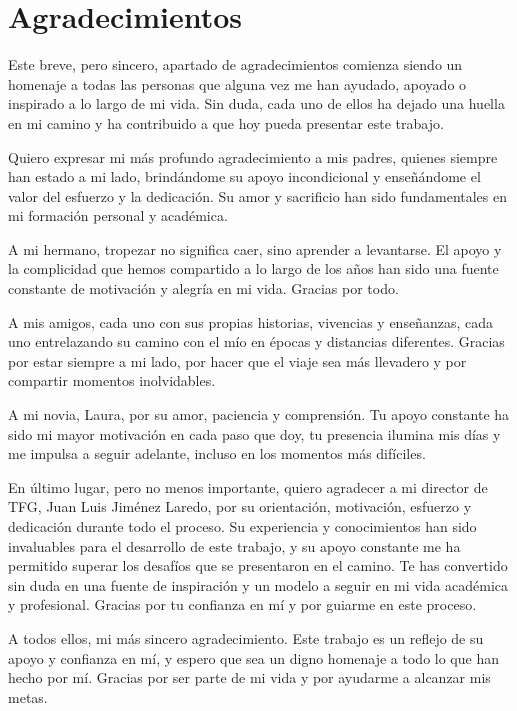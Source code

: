 \chapter*{Agradecimientos}

Este breve, pero sincero, apartado de agradecimientos comienza siendo un homenaje a todas las personas que alguna vez me han ayudado, apoyado o inspirado a lo largo de mi vida. Sin duda, cada uno de ellos ha dejado una huella en mi camino y ha contribuido a que hoy pueda presentar este trabajo.

Quiero expresar mi más profundo agradecimiento a mis padres, quienes siempre han estado a mi lado, brindándome su apoyo incondicional y enseñándome el valor del esfuerzo y la dedicación. Su amor y sacrificio han sido fundamentales en mi formación personal y académica.

A mi hermano, tropezar no significa caer, sino aprender a levantarse. El apoyo y la complicidad que hemos compartido a lo largo de los años han sido una fuente constante de motivación y alegría en mi vida. Gracias por todo.

A mis amigos, cada uno con sus propias historias, vivencias y enseñanzas, cada uno entrelazando su camino con el mío en épocas y distancias diferentes. Gracias por estar siempre a mi lado, por hacer que el viaje sea más llevadero y por compartir momentos inolvidables.

A mi novia, Laura, por su amor, paciencia y comprensión. Tu apoyo constante ha sido mi mayor motivación en cada paso que doy, tu presencia ilumina mis días y me impulsa a seguir adelante, incluso en los momentos más difíciles.

En último lugar, pero no menos importante, quiero agradecer a mi director de TFG, Juan Luis Jiménez Laredo, por su orientación, motivación, esfuerzo y dedicación durante todo el proceso. Su experiencia y conocimientos han sido invaluables para el desarrollo de este trabajo, y su apoyo constante me ha permitido superar los desafíos que se presentaron en el camino. Te has convertido sin duda en una fuente de inspiración y un modelo a seguir en mi vida académica y profesional. Gracias por tu confianza en mí y por guiarme en este proceso.

A todos ellos, mi más sincero agradecimiento. Este trabajo es un reflejo de su apoyo y confianza en mí, y espero que sea un digno homenaje a todo lo que han hecho por mí. Gracias por ser parte de mi vida y por ayudarme a alcanzar mis metas.